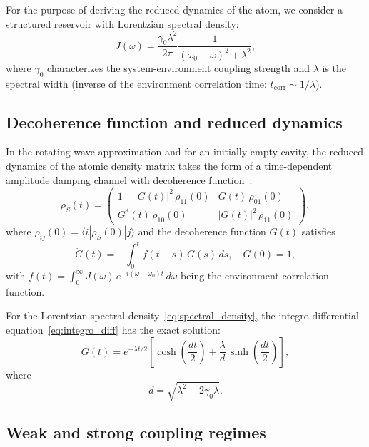 \documentclass[prl,twocolumn,superscriptaddress,longbibliography]{revtex4-2}
\newcommand{\ket}[1]{|#1\rangle}
\newcommand{\bra}[1]{\langle#1|}
\begin{document}
For the purpose of deriving the reduced dynamics of the atom, we
consider a structured reservoir with Lorentzian spectral density:
\begin{equation}
J(\omega) = \frac{\gamma_0 \lambda^2}{2\pi}
\frac{1}{(\omega_0 - \omega)^2 + \lambda^2},
\label{eq:spectral_density}
\end{equation}
where $\gamma_0$ characterizes the system-environment coupling
strength and $\lambda$ is the spectral width (inverse of the
environment correlation time: $t_{\mathrm{corr}} \sim 1/\lambda$).

\subsection{Decoherence function and reduced dynamics}

In the rotating wave approximation and for an initially empty
cavity, the reduced dynamics of the atomic density matrix takes
the form of a time-dependent amplitude damping channel with
decoherence function~\cite{BreuerPetruccione2002}:
\begin{equation}
\rho_S(t) = \begin{pmatrix}
1 - |G(t)|^2\,\rho_{11}(0) & G(t)\,\rho_{01}(0) \\
G^*(t)\,\rho_{10}(0) & |G(t)|^2\,\rho_{11}(0)
\end{pmatrix},
\label{eq:reduced_dynamics}
\end{equation}
where $\rho_{ij}(0) = \bra{i}\rho_S(0)\ket{j}$ and the decoherence
function $G(t)$ satisfies
\begin{equation}
\dot{G}(t) = -\int_0^t f(t - s)\, G(s)\, ds,
\quad G(0) = 1,
\label{eq:integro_diff}
\end{equation}
with $f(t) = \int_0^\infty J(\omega)\, e^{-i(\omega - \omega_0)t}\, d\omega$
being the environment correlation function.

For the Lorentzian spectral density~\eqref{eq:spectral_density},
the integro-differential equation~\eqref{eq:integro_diff} has
the exact solution:
\begin{equation}
\boxed{
G(t) = e^{-\lambda t/2}\!\left[
\cosh\!\left(\frac{dt}{2}\right)
+ \frac{\lambda}{d}\,\sinh\!\left(\frac{dt}{2}\right)
\right],}
\label{eq:G_exact}
\end{equation}
where
\begin{equation}
d = \sqrt{\lambda^2 - 2\gamma_0\lambda}.
\label{eq:d_def}
\end{equation}

\subsection{Weak and strong coupling regimes}
\end{document}
